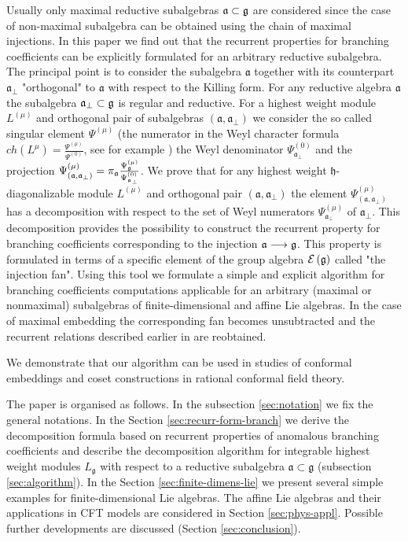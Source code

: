 \documentclass[12pt]{iopart}
\theoremstyle{definition}
\newcommand{\af}{\mathfrak{a}}
\newcommand{\afb}{\mathfrak{a}_{\bot}}
\newcommand{\hf}{\mathfrak{h}}
\begin{document}
Usually only maximal reductive subalgebras $\frak{a} \subset \frak{g} $ are considered since the case of non-maximal subalgebra
can be obtained using the chain of maximal injections. In this paper we find out that the recurrent properties
for branching coefficients can be explicitly formulated for an arbitrary reductive subalgebra.
The principal point is to consider the subalgebra $\af$ together with its
counterpart $\afb$ "orthogonal" to $\af$ with respect to the Killing form.
For any reductive algebra $\af$ the subalgebra $\afb \subset \frak{g} $ is regular and reductive.
For a highest weight module $L^{\left( \mu \right)}$ and orthogonal pair of subalgebras
$\left(  \af, \afb \right)$ we consider
the so called singular element $\Psi^{\left( \mu \right)}$ (the numerator
in the Weyl character formula
$ch\left( L^{\mu }\right) =\frac{\Psi ^{\left( \mu \right) }}{\Psi ^{\left( 0\right) }}$, see for example \cite{humphreys1997introduction})
the Weyl denominator $\Psi ^{\left( 0\right) }_{\afb}$ and the projection
$\Psi ^{\left( \mu \right) }_{\left(  \af, \afb \right)}=\pi_{\af}\frac{\Psi ^{\left( \mu \right) }_{\frak{g}}}{\Psi ^{\left( 0\right) }_{\afb}}$.
We prove that for any highest weight $\hf$-diagonalizable module $L^{\left( \mu \right)}$ and orthogonal pair
$\left(  \af, \afb \right)$ the element $\Psi ^{\left( \mu \right) }_{\left(  \af, \afb \right)}$ has a decomposition with respect to
the set of Weyl numerators $\Psi ^{\left( \mu \right) }_{ \afb }$ of $\afb$.
This decomposition provides the possibility to construct the recurrent property for branching coefficients corresponding
to the injection $\frak{a} \longrightarrow \frak{g} $.
This property is formulated in
terms of a specific element of the group algebra $\mathcal{E}\left( \frak{g} \right)$ called "the injection fan".
Using this tool we formulate a simple and
explicit algorithm for branching coefficients computations applicable for an arbitrary (maximal or nonmaximal)
subalgebras of finite-dimensional and affine Lie algebras.
In the case of maximal embedding the corresponding fan becomes unsubtracted and the recurrent relations described
earlier in \cite{ilyin812pbc} are reobtained.

We demonstrate that our algorithm can be used in studies of conformal embeddings and coset constructions
in rational conformal field theory.

The paper is organised as follows. In the subsection \ref{sec:notation}  we fix the general notations.
In the Section \ref{sec:recurr-form-branch} we derive the decomposition formula based on
recurrent properties of anomalous branching coefficients and describe the decomposition algorithm
for integrable highest weight modules
$L_{\mathfrak{g}}$ with respect to a reductive subalgebra $\mathfrak{a}\subset \mathfrak{g}$
(subsection \ref{sec:algorithm}). In the Section \ref{sec:finite-dimens-lie} we present several
simple examples for finite-dimensional Lie algebras. The affine Lie algebras and their applications in
CFT models are considered in Section \ref{sec:phys-appl}.
Possible further developments are discussed (Section \ref{sec:conclusion}).
\end{document}
